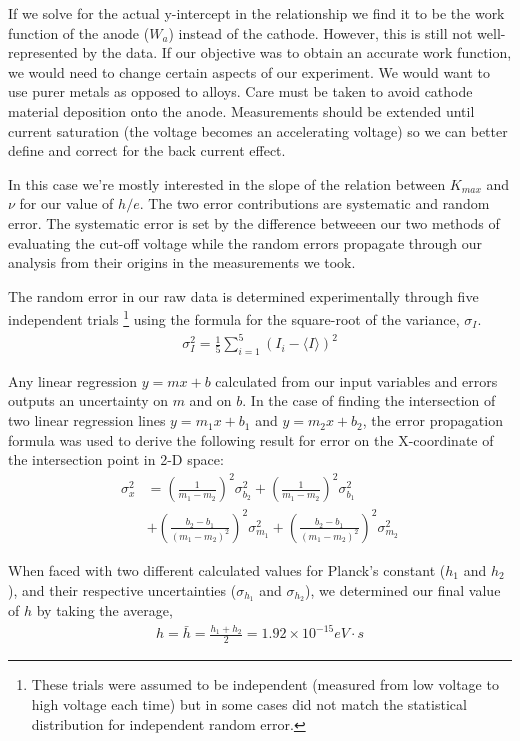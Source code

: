 \documentclass[aps,twocolumn,secnumarabic,nobalancelastpage,amsmath,amssymb,
nofootinbib]{revtex4}
\begin{document}
If we solve for the actual y-intercept in the relationship we find it to be the work function of the anode ($W_a$) instead of the cathode.  However, this is still not well-represented by the data.  If our objective was to obtain an accurate work function, we would need to change certain aspects of our experiment.  We would want to use purer metals as opposed to alloys.  Care must be taken to avoid cathode material deposition onto the anode.  Measurements should be extended until current saturation (the voltage becomes an accelerating voltage) so we can better define and correct for the back current effect.

In this case we're mostly interested in the slope of the relation between $K_{max}$ and $\nu$ for our value of $h/e$.  The two error contributions are systematic and random error.  The systematic error is set by the difference betweeen our two methods of evaluating the cut-off voltage while the random errors propagate through our analysis from their origins in the measurements we took.

The random error in our raw data is determined experimentally through five independent trials \footnote{These trials were assumed to be independent (measured from low voltage to high voltage each time) but in some cases did not match the statistical distribution for independent random error.} using the formula for the square-root of the variance, $\sigma_I$.
\begin{align}
\sigma_I^2 = \frac{1}{5} \sum_{i=1}^5 (I_i - \langle I \rangle)^2
\end{align}

Any linear regression $y=mx+b$ calculated from our input variables and errors outputs an uncertainty on $m$ and on $b$.  In the case of finding the intersection of two linear regression lines $y=m_1 x+b_1$ and $y = m_2 x + b_2$, the error propagation formula was used to derive the following result for error on the X-coordinate of the intersection point in 2-D space:
\begin{align} 
\nonumber \sigma_x^2 &= \left(\frac{1}{m_1 - m_2}\right)^2 \sigma_{b_2}^2 + 
             \left(\frac{1}{m_1 - m_2}\right)^2 \sigma_{b_1}^2 \\ &+
		 \left(\frac{b_2 - b_1}{(m_1 - m_2)^2}\right)^2 \sigma_{m_1}^2 +
		 \left(\frac{b_2 - b_1}{(m_1 - m_2)^2}\right)^2 \sigma_{m_2}^2
\end{align}

When faced with two different calculated values for Planck's constant ($h_1$ and $h_2$), and their respective uncertainties ($\sigma_{h_1}$ and $\sigma_{h_2}$), we determined our final value of $h$ by taking the average, 
\begin{align}
h = \bar{h} = \frac{h_1 + h_2}{2} = 1.92 \times 10^{-15} eV \cdot s
\end{align}
\end{document}
